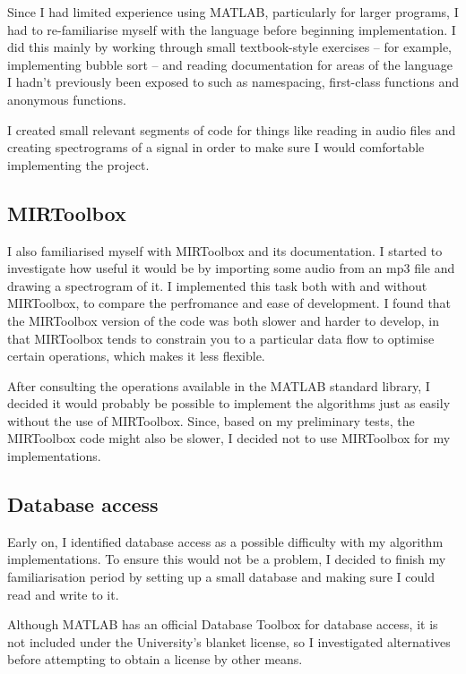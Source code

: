 \documentclass[12pt,a4paper,twoside,openright]{report}
\begin{document}
Since I had limited experience using MATLAB, particularly for larger programs, I had to re-familiarise myself with the language before beginning implementation. I did this mainly by working through small textbook-style exercises -- for example, implementing bubble sort -- and reading documentation for areas of the language I hadn't previously been exposed to such as namespacing, first-class functions and anonymous functions.

I created small relevant segments of code for things like reading in audio files and creating spectrograms of a signal in order to make sure I would comfortable implementing the project.

\subsection{MIRToolbox}

I also familiarised myself with MIRToolbox and its documentation. I started to investigate how useful it would be by importing some audio from an mp3 file and drawing a spectrogram of it. I implemented this task both with and without MIRToolbox, to compare the perfromance and ease of development. I found that the MIRToolbox version of the code was both slower and harder to develop, in that MIRToolbox tends to constrain you to a particular data flow to optimise certain operations, which makes it less flexible.

After consulting the operations available in the MATLAB standard library, I decided it would probably be possible to implement the algorithms just as easily without the use of MIRToolbox. Since, based on my preliminary tests, the MIRToolbox code might also be slower, I decided not to use MIRToolbox for my implementations.

\subsection{Database access}
\label{section:dbaccess}

Early on, I identified database access as a possible difficulty with my algorithm implementations. To ensure this would not be a problem, I decided to finish my familiarisation period by setting up a small database and making sure I could read and write to it.

Although MATLAB has an official Database Toolbox for database access, it is not included under the University's blanket license, so I investigated alternatives before attempting to obtain a license by other means.
\end{document}
